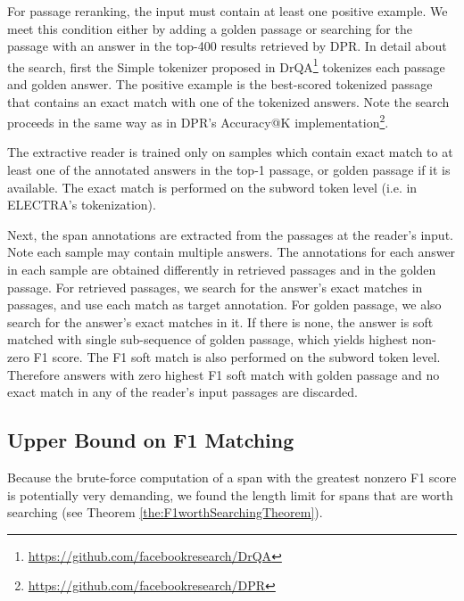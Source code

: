 \documentclass[11pt]{article}
\begin{document}
For passage reranking, the input must contain at least one positive example. We meet this condition either by adding a golden passage or searching for the passage with an answer in the top-400 results retrieved by DPR. In detail about the search, first the Simple tokenizer proposed in DrQA\footnote{\url{https://github.com/facebookresearch/DrQA}} tokenizes each passage and golden answer. The positive example is the best-scored tokenized passage that contains an exact match with one of the tokenized answers. Note the search proceeds in the same way as in DPR's Accuracy@K implementation\footnote{\url{https://github.com/facebookresearch/DPR}}.























The extractive reader is trained only on samples which contain exact match to at least one of the annotated answers in the top-1 passage, or golden passage if it is available. 
The exact match is performed on the subword token level (i.e. in ELECTRA's tokenization).

Next, the span annotations are extracted from the passages at the reader's input. Note each sample may contain multiple answers. The annotations for each answer in each sample are obtained differently in retrieved passages and in the golden passage. 
For retrieved passages, we search for the answer's exact matches in passages, and use each match as target annotation. 
For golden passage, we also search for the answer's exact matches in it. If there is none, the answer is soft matched with single sub-sequence of golden passage, which yields highest non-zero F1 score. The F1 soft match is also performed on the subword token level. Therefore answers with zero highest F1 soft match with golden passage and no exact match in any of the reader's input passages are discarded.

\subsection{Upper Bound on F1 Matching}
Because the brute-force computation of a span with the greatest  nonzero F1 score is potentially very demanding, we found the length limit for spans that are worth searching (see Theorem \ref{the:F1worthSearchingTheorem}).
\end{document}

